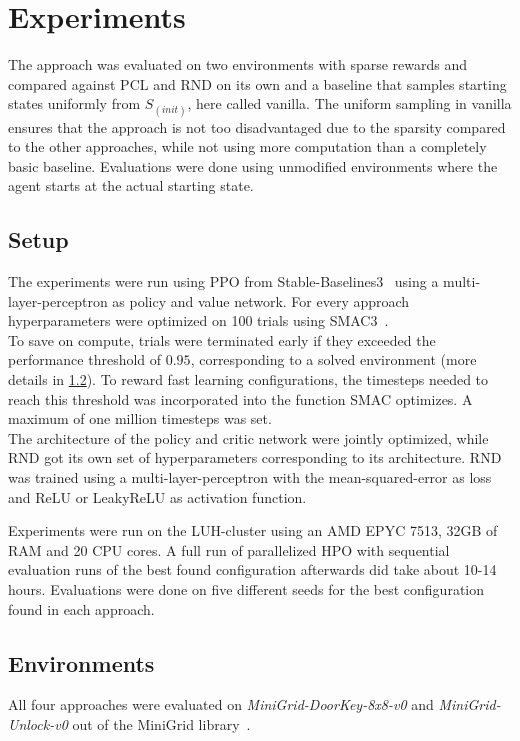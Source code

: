 \documentclass{article}
\begin{document}
\section{Experiments}
\label{sec:experiments}
The approach was evaluated on two environments with sparse rewards and compared against PCL and RND on its own and a baseline that samples starting states uniformly from $S_{(init)}$, here called vanilla. The uniform sampling in vanilla ensures that the approach is not too disadvantaged due to the sparsity compared to the other approaches, while not using more computation than a completely basic baseline. Evaluations were done using unmodified environments where the agent starts at the actual starting state.

\subsection{Setup}
\label{sec:setup}
The experiments were run using PPO from Stable-Baselines3~\citep{sb3} using a multi-layer-perceptron as policy and value network. For every approach hyperparameters were optimized on 100 trials using SMAC3~\citep{smac}. \\
To save on compute, trials were terminated early if they exceeded the performance threshold of $0.95$, corresponding to a solved environment (more details in \cref{sec:environments}). To reward fast learning configurations, the timesteps needed to reach this threshold was incorporated into the function SMAC optimizes. A maximum of one million timesteps was set. \\
The architecture of the policy and critic network were jointly optimized, while RND got its own set of hyperparameters corresponding to its architecture. RND was trained using a multi-layer-perceptron with the mean-squared-error as loss and ReLU or LeakyReLU as activation function.

Experiments were run on the LUH-cluster using an AMD EPYC 7513, 32GB of RAM and 20 CPU cores. A full run of parallelized HPO with sequential evaluation runs of the best found configuration afterwards did take about 10-14 hours. Evaluations were done on five different seeds for the best configuration found in each approach.

\subsection{Environments}
\label{sec:environments}

All four approaches were evaluated on \textit{MiniGrid-DoorKey-8x8-v0} and \textit{MiniGrid-Unlock-v0} out of the MiniGrid library~\citep{minigrid}.
\end{document}
